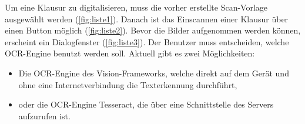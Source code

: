 \documentclass[notables, nomenclature, oneside, 150]{HSMW-Thesis}
\begin{document}
			Um eine Klausur zu digitalisieren, muss die vorher erstellte Scan-Vorlage ausgewählt werden (\ref{fig:liste1}). Danach ist das Einscannen einer Klausur über einen Button möglich (\ref{fig:liste2}). Bevor die Bilder aufgenommen werden können, erscheint ein Dialogfenster (\ref{fig:liste3}). Der Benutzer muss entscheiden, welche OCR-Engine benutzt werden soll. Aktuell gibt es zwei Möglichkeiten:
			\vspace{-5mm}
			\begin{itemize}
				\item Die OCR-Engine des Vision-Frameworks, welche direkt auf dem Gerät und ohne eine Internetverbindung die Texterkennung durchführt,  
				\item oder die OCR-Engine Tesseract, die über eine Schnittstelle des Servers aufzurufen ist.
			\end{itemize}
\end{document}
